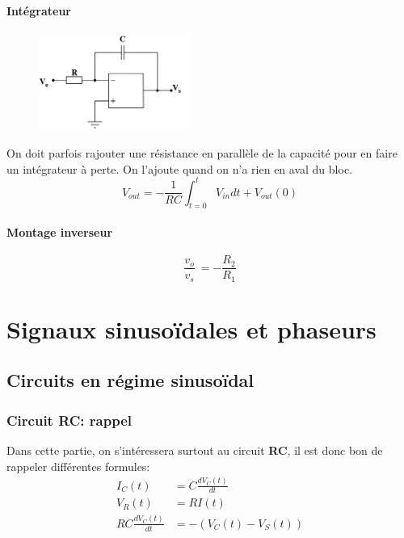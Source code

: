 \documentclass{report}
\begin{document}
\subsubsection{Intégrateur}
\begin{figure}[H]
\centering
\includegraphics[width=5cm]{img/800px-Aopintegrating.svg.png}
\end{figure}
On doit parfois rajouter une résistance en parallèle de la capacité pour en faire un intégrateur à perte. On l'ajoute quand on n'a rien en aval du bloc.
\begin{equation}
V_{out} = - \frac{1}{RC} \int_{t = 0}^{t} V_{in} dt + V_{out} (0)
\end{equation}





\subsubsection{Montage inverseur}
\begin{equation}
\frac{v_o}{v_s} ~= -\frac{R_2}{R_1}
\end{equation}

\chapter{Signaux sinusoïdales et phaseurs}
\section{Circuits en régime sinusoïdal}

\subsection{Circuit RC: rappel}
Dans cette partie, on s'intéressera surtout au circuit \textbf{RC}, il est donc bon de rappeler différentes formules:
\begin{align}
I_C(t) &= C \frac{dV_C(t)}{dt}\\
V_R(t) &= RI(t)\\
RC \frac{dV_C(t)}{dt} &= -(V_C(t)-V_S(t))\label{eq:RCsinus}
\end{align}
\end{document}
